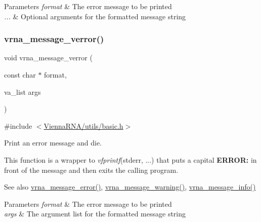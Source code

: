 \begin{DoxyParams}{Parameters}
{\em format} & The error message to be printed \\
\hline
{\em ...} & Optional arguments for the formatted message string \\
\hline
\end{DoxyParams}
\mbox{\label{group__message__utils_gabc1a08dea0d84b5c33701732172a8b18}} 
\subsubsection{\texorpdfstring{vrna\+\_\+message\+\_\+verror()}{vrna\_message\_verror()}}
{\footnotesize\ttfamily void vrna\+\_\+message\+\_\+verror (\begin{DoxyParamCaption}\item[{const char $\ast$}]{format,  }\item[{va\+\_\+list}]{args }\end{DoxyParamCaption})}



{\ttfamily \#include $<$\hyperlink{utils_2basic_8h}{Vienna\+R\+N\+A/utils/basic.\+h}$>$}



Print an error message and die. 

This function is a wrapper to {\itshape vfprintf}(stderr, ...) that puts a capital {\bfseries E\+R\+R\+OR\+:} in front of the message and then exits the calling program.

\begin{DoxySeeAlso}{See also}
\hyperlink{group__message__utils_ga36b35be01d7f36cf7f59c245eee628d1}{vrna\+\_\+message\+\_\+error()}, \hyperlink{group__message__utils_ga6e07ed24add60693ba886d54d0a46635}{vrna\+\_\+message\+\_\+warning()}, \hyperlink{group__message__utils_ga039bae6153a6415b054dbe6045f83d03}{vrna\+\_\+message\+\_\+info()}
\end{DoxySeeAlso}

\begin{DoxyParams}{Parameters}
{\em format} & The error message to be printed \\
\hline
{\em args} & The argument list for the formatted message string \\
\hline
\end{DoxyParams}
\mbox{\label{group__message__utils_ga6e07ed24add60693ba886d54d0a46635}} 
